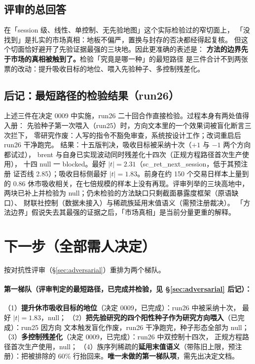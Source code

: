 \documentclass[11pt]{ctexart}
\begin{document}
\subsection{评审的总回答}
在「session 级、线性、单控制、无先验地图」这个实际检验过的窄切面上，
「没找到」是扎实的市场真相：地板不偏严，置换与封存的否决都经得起复核。
但这个切面恰好避开了先验证据最强的三块地。因此更准确的表述是：
\textbf{方法的边界先于市场的真相被触到了。}检验「究竟是哪一种」的最短路径
是三件合计不到两张票的改动：提升吸收目标的地位、喂入先验种子、多控制残差化。

\subsection{后记：最短路径的检验结果（run26）}
上述三件在决定 0009 中实施，run26 二十回合作直接检验。过程本身有两处值得入册：
先验种子第一次喂入（run25）时，方向文本里的一个效果词被盲化断言三次拦下，
零研究作废：人写的指令不豁免审查，系统按设计工作；改词重启后 run26 干净跑完。
结果：十五版判决，吸收目标被采纳十次（$+1$ 与 $-1$ 两个方向都试过），
brent 与自身已实现波动同时残差化十四次（正规方程路径首次生产使用），
十四 null 一 blocked。最好 $|t|=2.31$（sc\_ret\_next\_session，低于其预注册
证否线 2.85）；吸收目标侧最好 $|t|=1.83$。前身在约 150 个交易日样本上量到的
$0.86$ 休市吸收相关，在七倍规模的样本上没有再现。评审列举的三块高地中，
两块已补上并检验为 null；仍未检验的方法缺口只剩截面暴露度框架（原语缺口）、
财联社控制（数据未接入）与稀疏族延用末值语义（需预注册裁决）。
「方法边界」假说失去其最强的证据之后，「市场真相」是当前分量更重的解释。

\section{下一步（全部需人决定）}
按对抗性评审（\S\ref{sec:adversarial}）重排为两个梯队。

\paragraph{第一梯队（评审判定的最短路径，已完成并检验，见
\S\ref{sec:adversarial} 后记）：}
（1）\textbf{提升休市吸收目标的地位}（决定 0009，已完成）：run26 中被采纳十次，
最好 $|t|=1.83$，null；
（2）\textbf{把先验研究的四个阳性种子作为研究方向喂入}（已完成）：run25 因方向
文本触发盲化作废，run26 干净跑完，种子形态全部为 null；
（3）\textbf{多控制残差化}（决定 0009，已完成）：run26 中双控制十四次，
正规方程路径首次生产使用，null；
（4）族序列稀疏的\textbf{延用末值语义}（带陈旧上限，预注册）：把被排除的
60\% 行抬回来。\textbf{唯一未做的第一梯队项}，需先出决定文档。
\end{document}
